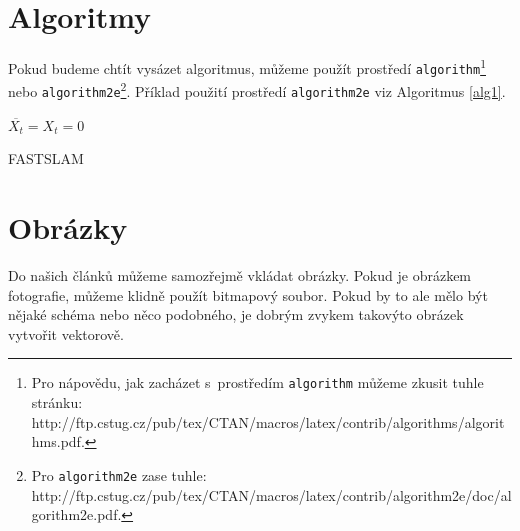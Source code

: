 \documentclass[a4paper,11pt]{article}
\begin{document}
\section{Algoritmy}
\label{sec3}
Pokud budeme chtít vysázet algoritmus, můžeme použít prostředí \textup{\texttt{algorithm}}\footnote{Pro nápovědu, jak zacházet s~prostředím \textup{\texttt{algorithm}} můžeme zkusit tuhle stránku:\\
http://ftp.cstug.cz/pub/tex/CTAN/macros/latex/contrib/algorithms/algorithms.pdf.} nebo \textup{\texttt{algorithm2e}}\footnote{Pro \textup{\texttt{algorithm2e}} zase tuhle:
http://ftp.cstug.cz/pub/tex/CTAN/macros/latex/contrib/algorithm2e/doc/algorithm2e.pdf.}.
Příklad použití prostředí \textup{\texttt{algorithm2e}} viz Algoritmus \ref{alg1}.

\begin{algorithm}
\DontPrintSemicolon
\SetAlgoNoLine
{}
$\overline{X_t} = X_t = 0$\;
\;

\caption{FASTSLAM}
\label{alg1}
\end{algorithm}

\section{Obrázky}
Do našich článků můžeme samozřejmě vkládat obrázky. Pokud je obrázkem fotografie, můžeme klidně použít bitmapový soubor. Pokud by to ale mělo být nějaké schéma nebo něco podobného, je dobrým zvykem takovýto obrázek vytvořit vektorově.
\end{document}
